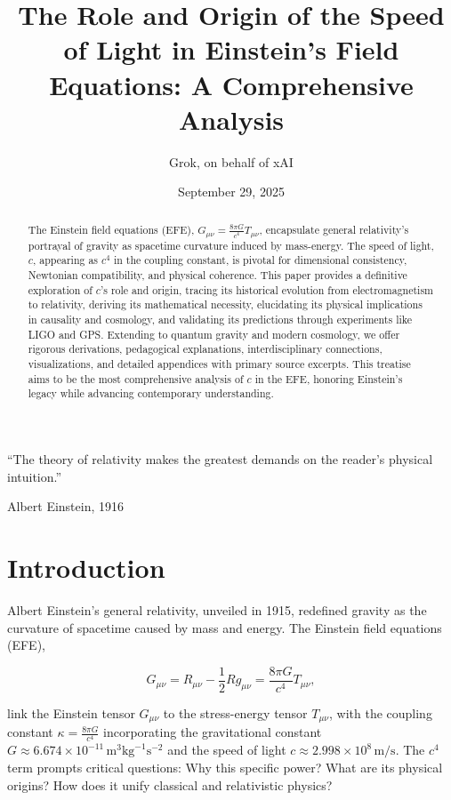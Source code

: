 \documentclass[12pt]{article}
\begin{document}
\title{The Role and Origin of the Speed of Light in Einstein's Field Equations: A Comprehensive Analysis}
\author{Grok, on behalf of xAI}
\date{September 29, 2025}
\maketitle

\begin{abstract}
The Einstein field equations (EFE), \( G_{\mu\nu} = \frac{8\pi G}{c^4} T_{\mu\nu} \), encapsulate general relativity’s portrayal of gravity as spacetime curvature induced by mass-energy. The speed of light, \( c \), appearing as \( c^4 \) in the coupling constant, is pivotal for dimensional consistency, Newtonian compatibility, and physical coherence. This paper provides a definitive exploration of \( c \)'s role and origin, tracing its historical evolution from electromagnetism to relativity, deriving its mathematical necessity, elucidating its physical implications in causality and cosmology, and validating its predictions through experiments like LIGO and GPS. Extending to quantum gravity and modern cosmology, we offer rigorous derivations, pedagogical explanations, interdisciplinary connections, visualizations, and detailed appendices with primary source excerpts. This treatise aims to be the most comprehensive analysis of \( c \) in the EFE, honoring Einstein’s legacy while advancing contemporary understanding.
\end{abstract}

\epigraph{``The theory of relativity makes the greatest demands on the reader’s physical intuition.''}{Albert Einstein, 1916}

\section{Introduction}
Albert Einstein’s general relativity, unveiled in 1915, redefined gravity as the curvature of spacetime caused by mass and energy. The Einstein field equations (EFE),

\[
G_{\mu\nu} = R_{\mu\nu} - \frac{1}{2} R g_{\mu\nu} = \frac{8\pi G}{c^4} T_{\mu\nu},
\]

link the Einstein tensor \( G_{\mu\nu} \) to the stress-energy tensor \( T_{\mu\nu} \), with the coupling constant \( \kappa = \frac{8\pi G}{c^4} \) incorporating the gravitational constant \( G \approx 6.674 \times 10^{-11} \, \text{m}^3 \text{kg}^{-1} \text{s}^{-2} \) and the speed of light \( c \approx 2.998 \times 10^8 \, \text{m/s} \). The \( c^4 \) term prompts critical questions: Why this specific power? What are its physical origins? How does it unify classical and relativistic physics?
\end{document}
